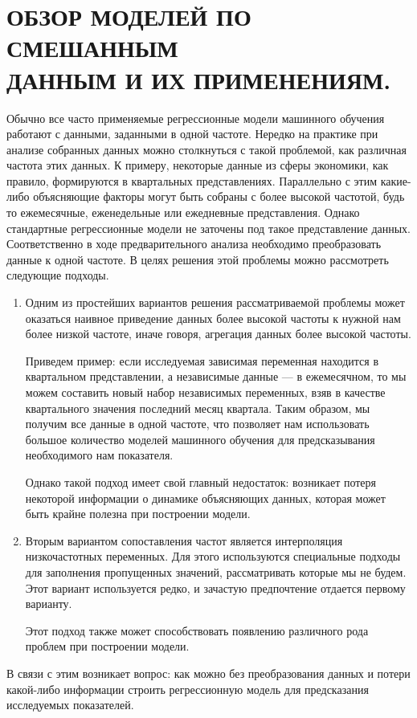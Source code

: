 \documentclass[a4paper, 12pt]{extarticle}
\begin{document}
	\section{ОБЗОР МОДЕЛЕЙ ПО СМЕШАННЫМ \\ДАННЫМ И ИХ ПРИМЕНЕНИЯМ.}
	Обычно все часто применяемые регрессионные модели машинного обучения работают с данными, заданными в одной частоте. Нередко на практике при анализе собранных данных можно столкнуться с такой проблемой, как различная частота этих данных. К примеру, некоторые данные из сферы экономики, как правило, формируются в квартальных представлениях. Параллельно с этим какие-либо объясняющие факторы могут быть собраны с более высокой частотой, будь то ежемесячные, еженедельные или ежедневные представления. Однако стандартные регрессионные модели не заточены под такое представление данных. Соответственно в ходе предварительного анализа необходимо преобразовать данные к одной частоте. В целях решения этой проблемы можно рассмотреть следующие подходы.
	\begin{enumerate}
		\item Одним из простейших вариантов решения рассматриваемой проблемы может оказаться наивное приведение данных более высокой частоты к нужной нам более низкой частоте, иначе говоря, агрегация данных более высокой частоты. 
		
		Приведем пример: если исследуемая зависимая переменная находится в квартальном представлении, а независимые данные --- в ежемесячном, то мы можем составить новый набор независимых переменных, взяв в качестве квартального значения последний месяц квартала. Таким образом, мы получим все данные в одной частоте, что позволяет нам использовать большое количество моделей машинного обучения для предсказывания необходимого нам показателя.
		
		Однако такой подход имеет свой главный недостаток:
		возникает потеря некоторой информации о динамике объясняющих данных, которая может быть крайне полезна при построении модели.
		\item Вторым вариантом сопоставления частот является интерполяция низкочастотных
		переменных. Для этого используются специальные подходы для заполнения пропущенных значений, рассматривать которые мы не будем. Этот вариант используется редко, и зачастую предпочтение отдается первому варианту.
		
		Этот подход также может способствовать появлению различного рода проблем при построении модели.
	\end{enumerate}
	В связи с этим возникает вопрос: как можно без преобразования данных и потери какой-либо информации строить регрессионную модель для предсказания исследуемых показателей. 
	
\end{document}
